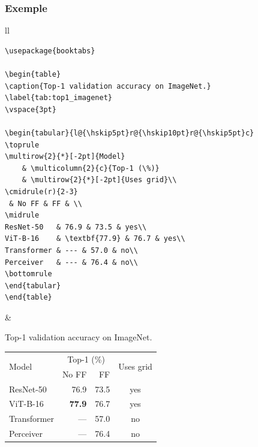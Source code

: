 \documentclass[aspectratio=169]{beamer}
\begin{document}
\begin{frame}[fragile]\frametitle{Exemple}
\vspace{-7mm}

\begin{tabular}{ll}
\tiny
\begin{minipage}{.55\textwidth}
\begin{verbatim}
\usepackage{booktabs}

\begin{table}
\caption{Top-1 validation accuracy on ImageNet.}
\label{tab:top1_imagenet}
\vspace{3pt}

\begin{tabular}{l@{\hskip5pt}r@{\hskip10pt}r@{\hskip5pt}c}
\toprule
\multirow{2}{*}[-2pt]{Model}
    & \multicolumn{2}{c}{Top-1 (\%)}
    & \multirow{2}{*}[-2pt]{Uses grid}\\
\cmidrule(r){2-3}
 & No FF & FF & \\
\midrule
ResNet-50   & 76.9 & 73.5 & yes\\
ViT-B-16    & \textbf{77.9} & 76.7 & yes\\
Transformer & --- & 57.0 & no\\
Perceiver   & --- & 76.4 & no\\
\bottomrule
\end{tabular}
\end{table}
\end{verbatim}
\end{minipage}
& 
\begin{minipage}{.39\textwidth}
\scriptsize\rmfamily
Top-1 validation accuracy on ImageNet.
\vspace*{3pt}

\begin{tabular}{l@{\hskip5pt}r@{\hskip10pt}r@{\hskip5pt}c}
\toprule
\multirow{2}{*}[-2pt]{Model}
    & \multicolumn{2}{c}{Top-1 (\%)}
    & \multirow{2}{*}[-2pt]{Uses grid}\\
\cmidrule(r){2-3}
 & No FF & FF & \\
\midrule
ResNet-50   & 76.9 & 73.5 & yes\\
ViT-B-16    & \textbf{77.9} & 76.7 & yes\\
Transformer & --- & 57.0 & no\\
Perceiver   & --- & 76.4 & no\\
\bottomrule
\end{tabular}

\end{minipage}
\end{tabular}

\end{frame}
\end{document}
